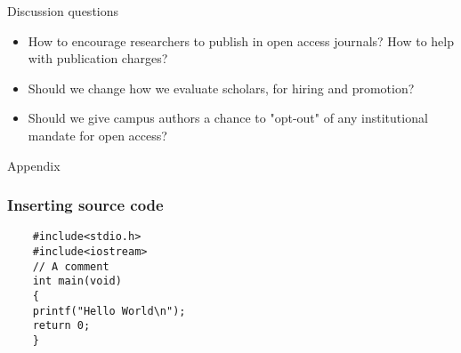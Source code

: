 \documentclass[12pt,t]{beamer}
\newcommand{\bi}{\begin{itemize}}
\newcommand{\ei}{\end{itemize}}
\begin{document}
{


\begin{frame}{Discussion questions}

\vspace{12pt}

{\small
\bi
\itemsep12pt
    \item How to encourage researchers to publish in open access
      journals? How to help with publication charges?
    \item Should we change how we evaluate scholars, for hiring and
      promotion?
    \item Should we give campus authors a chance to "opt-out" of any
      institutional mandate for open access?
  \ei
}

\end{frame}
}


\begin{frame}{Appendix}

\end{frame}



\begin{frame}[fragile]
\frametitle{Inserting source code}
\begin{lstlisting}
    #include<stdio.h>
    #include<iostream>
    // A comment
    int main(void)
    {
    printf("Hello World\n");
    return 0;
    }
\end{lstlisting}
\end{frame}
\end{document}
